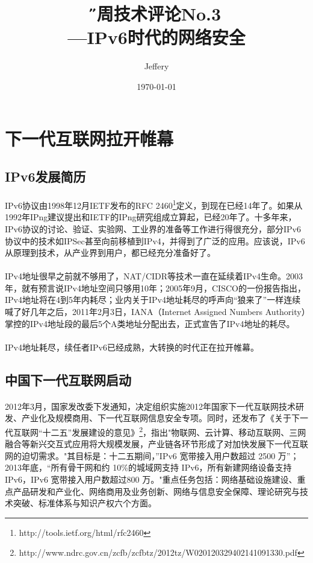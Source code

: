 \documentclass[a4paper,14pt,openany]{article}
\title{\H 每周技术评论No.3\\ ---IPv6时代的网络安全}
\author{Jeffery}
\date{\E\today}
\begin{document}
\maketitle %

\newpage %
\tableofcontents %

\newpage
\section{下一代互联网拉开帷幕} %
\subsection{IPv6发展简历}
\paragraph{}
IPv6协议由1998年12月IETF发布的RFC 2460\footnote{http://tools.ietf.org/html/rfc2460}定义，到现在已经14年了。如果从1992年IPng建议提出和IETF的IPng研究组成立算起，已经20年了。十多年来，IPv6协议的讨论、验证、实验网、工业界的准备等工作进行得很充分，部分IPv6协议中的技术如IPSec甚至向前移植到IPv4，并得到了广泛的应用。应该说，IPv6从原理到技术，从产业界到用户，都已经充分准备好了。
\paragraph{}
IPv4地址很早之前就不够用了，NAT/CIDR等技术一直在延续着IPv4生命。2003年，就有预言说IPv4地址空间只够用10年；2005年9月，CISCO的一份报告指出，IPv4地址将在4到5年内耗尽；业内关于IPv4地址耗尽的呼声向“狼来了”一样连续喊了好几年之后，2011年2月3日，IANA（Internet Assigned Numbers Authority）掌控的IPv4地址段的最后5个A类地址分配出去，正式宣告了IPv4地址的耗尽。
\paragraph{}
IPv4地址耗尽，续任者IPv6已经成熟，大转换的时代正在拉开帷幕。

\subsection{中国下一代互联网启动}
\paragraph{}
2012年3月，国家发改委下发通知，决定组织实施2012年国家下一代互联网技术研发、产业化及规模商用、下一代互联网信息安全专项。同时，还发布了《关于下一代互联网“十二五”发展建设的意见》\footnote{http://www.ndrc.gov.cn/zcfb/zcfbtz/2012tz/W020120329402141091330.pdf}，指出"物联网、云计算、移动互联网、三网融合等新兴交互式应用将大规模发展，产业链各环节形成了对加快发展下一代互联网的迫切需求。"其目标是：十二五期间，”IPv6 宽带接入用户数超过 2500 万”；2013年底，“所有骨干网和约 10\%的城域网支持 IPv6，所有新建网络设备支持 IPv6，IPv6 宽带接入用户数超过800 万。"重点任务包括：网络基础设施建设、重点产品研发和产业化、网络商用及业务创新、网络与信息安全保障、理论研究与技术突破、标准体系与知识产权六个方面。
\end{document}
